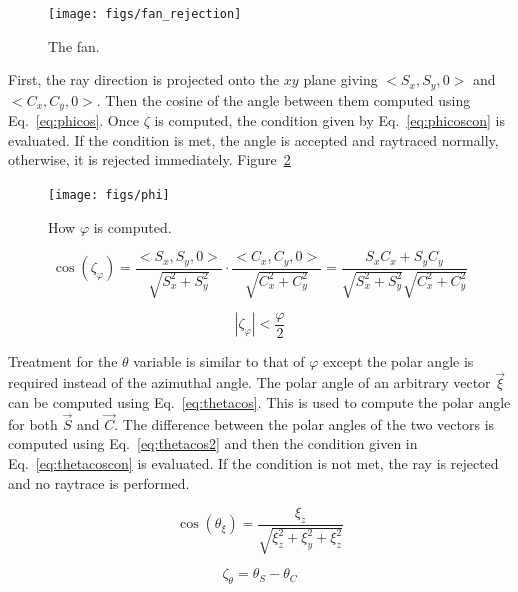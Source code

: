 \begin{figure}[tb]
  \begin{center}
   \texttt{[image: figs/fan\_rejection]}
  \end{center}
  \caption{The fan.}
\label{fig:fan_rejection}
\end{figure}

First, the ray direction is projected onto the $xy$ plane giving $<S_x, S_y, 0>$ and $<C_x, C_y, 0>$. Then the cosine of the angle between them computed using Eq.~\ref{eq:phicos}. Once $\zeta$ is computed, the condition given by Eq.~\ref{eq:phicoscon} is evaluated. If the condition is met, the angle is accepted and raytraced normally, otherwise, it is rejected immediately. Figure~\ref{fig:phi}

\begin{figure}[tb]
  \begin{center}
   \texttt{[image: figs/phi]}
  \end{center}
  \caption{How $\varphi$ is computed.}
\label{fig:phi}
\end{figure}

\begin{equation}\label{eq:phicos}
\cos(\zeta_\varphi) = \frac{<S_x, S_y, 0>}{\sqrt{S_x^2 + S_y^2}} \cdot \frac{<C_x, C_y, 0>}{\sqrt{C_x^2 + C_y^2}} = \frac{S_x C_x + S_y C_y}{\sqrt{S_x^2 + S_y^2} \sqrt{C_x^2 + C_y^2}}
\end{equation}

\begin{equation}\label{eq:phicoscon}
|\zeta_\varphi| < \frac{\varphi}{2}
\end{equation}

Treatment for the $\theta$ variable is similar to that of $\varphi$ except the polar angle is required instead of the azimuthal angle. The polar angle of an arbitrary vector $\vec{\xi}$ can be computed using Eq.~\ref{eq:thetacos}. This is used to compute the polar angle for both $\vec{S}$ and $\vec{C}$. The difference between the polar angles of the two vectors is computed using Eq.~\ref{eq:thetacos2} and then the condition given in Eq.~\ref{eq:thetacoscon} is evaluated. If the condition is not met, the ray is rejected and no raytrace is performed.

\begin{equation}\label{eq:thetacos}
\cos(\theta_\xi) = \frac{\xi_z}{\sqrt{\xi_z^2 + \xi_y^2 + \xi_z^2}}
\end{equation}

\begin{equation}\label{eq:thetacos2}
\zeta_\theta = \theta_S - \theta_C
\end{equation}

